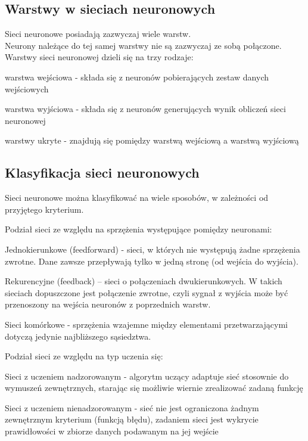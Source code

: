 \subsection{Warstwy w sieciach neuronowych}
Sieci neuronowe posiadają zazwyczaj wiele warstw. \\
Neurony należące do tej samej warstwy nie są zazwyczaj ze sobą połączone.
Warstwy sieci neuronowej dzieli się na trzy rodzaje:
\begin{itemize*}
\item warstwa wejściowa - składa się z neuronów pobierających zestaw danych
wejściowych
\item warstwa wyjściowa - składa się z neuronów generujących wynik obliczeń
sieci neuronowej
\item warstwy ukryte - znajdują się pomiędzy warstwą wejściową a warstwą wyjściową
\end{itemize*}

\subsection{Klasyfikacja sieci neuronowych}
Sieci neuronowe można klasyfikować na wiele sposobów, w zależności od przyjętego kryterium.
\begin{enumerate*}
\item Podział sieci ze względu na sprzężenia występujące pomiędzy neuronami:
\begin{itemize*}
\item Jednokierunkowe (feedforward) - sieci, w których nie występują żadne
sprzężenia zwrotne. Dane zawsze przepływają tylko w jedną stronę (od
wejścia do wyjścia).
\item Rekurencyjne (feedback) – sieci o połączeniach dwukierunkowych.
W takich sieciach dopuszczone jest połączenie zwrotne, czyli sygnał z
wyjścia może być przenoszony na wejścia neuronów z poprzednich warstw.
\item Sieci komórkowe - sprzężenia wzajemne między elementami
przetwarzającymi dotyczą jedynie najbliższego sąsiedztwa.
\end{itemize*}
\item Podział sieci ze względu na typ uczenia się:
\begin{itemize*}
\item Sieci z uczeniem nadzorowanym - algorytm uczący adaptuje sieć stosownie do wymuszeń zewnętrznych, starając się możliwie wiernie zrealizować zadaną funkcję
\item Sieci z uczeniem nienadzorowanym - sieć nie jest ograniczona żadnym zewnętrznym kryterium (funkcją błędu), zadaniem sieci jest wykrycie prawidłowości w
zbiorze danych podawanym na jej wejście
\end{itemize*}
\end{enumerate*}

